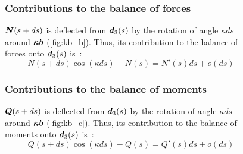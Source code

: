 \begin{figure}[p]
	\begin{fullpage}
	\subsubsection{Contributions to the balance of forces}
	\vspace{10pt}
	$\boldsymbol{N}(s+ds)$ is deflected from $\boldsymbol{d}_3(s)$ by the rotation of angle $\kappa ds$ around $\boldsymbol{\kappa b}$ (\cref{fig:kb_b}). Thus, its contribution to the balance of forces onto $\boldsymbol{d}_3(s)$ is~:
	\begin{equation*}
		N(s+ds) \cos(\kappa ds) - N(s) = N'(s) ds + o(ds)
	\end{equation*}
	\vspace{10pt}

	\subsubsection{Contributions to the balance of moments}
	\vspace{10pt}
	$\boldsymbol{Q}(s+ds)$ is deflected from $\boldsymbol{d}_3(s)$ by the rotation of angle $\kappa ds$ around $\boldsymbol{\kappa b}$ (\cref{fig:kb_c}). Thus, its contribution to the balance of moments onto $\boldsymbol{d}_3(s)$ is~:
	\begin{equation*}
		Q(s+ds) \cos(\kappa ds) - Q(s) = Q'(s) ds + o(ds)
	\end{equation*}
	  \end{fullpage}
\end{figure}


